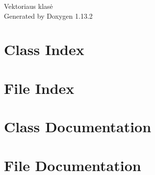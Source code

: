 \documentclass[twoside]{book}
\newcommand{\+}{\discretionary{\mbox{\scriptsize$\hookleftarrow$}}{}{}}
\newcommand{\clearemptydoublepage}{%
    \newpage{\pagestyle{empty}\cleardoublepage}%
  }
\begin{document}
  \raggedbottom
    \hypersetup{pageanchor=false,
                bookmarksnumbered=true,
                pdfencoding=unicode
               }
  \begin{titlepage}
  \vspace*{7cm}
  \begin{center}%
  {\Large Vektoriaus klasė}\\
  \vspace*{1cm}
  {\large Generated by Doxygen 1.13.2}\\
  \end{center}
  \end{titlepage}
  \clearemptydoublepage
  \tableofcontents
  \clearemptydoublepage
  \hypersetup{pageanchor=true}
\chapter{Class Index}

\chapter{File Index}

\chapter{Class Documentation}

\chapter{File Documentation}

  \backmatter
  \newpage
  \clearemptydoublepage
  \printindex
\end{document}
